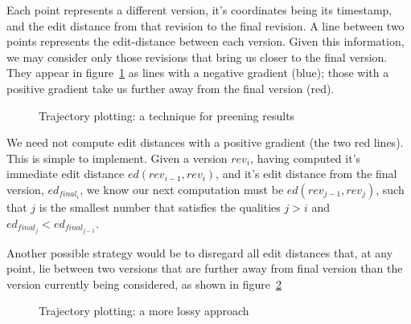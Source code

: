 Each point represents a different version, it's coordinates being its
timestamp, and the edit distance from that revision to the final
revision. A line between two points represents the edit-distance
between each version. Given this information, we may consider only
those revisions that bring us closer to the final version. They appear
in figure~\ref{fig:traj-preen-1} as lines with a negative gradient
(blue); those with a positive gradient take us further away from the
final version (red).

\begin{figure}
  \centering
  \pgfplotsset{width=0.4\textwidth}
  \caption{Trajectory plotting: a technique for preening results}
  \label{fig:traj-preen-1}
\end{figure}

We need not compute edit distances with a positive gradient (the two
red lines). This is simple to implement. Given a version $rev_i$, having
computed it's immediate edit distance $ed(rev_{i-1},rev_i)$, and it's edit
distance from the final version, $ed_{final_i}$, we know our next
computation must be $ed(rev_{j-1},rev_j)$, such that $j$ is the smallest
number that satisfies the qualities $j > i$ and $ed_{final_j} <
ed_{final_{j-1}}$.

Another possible strategy would be to disregard all edit distances
that, at any point, lie between two versions that are further away
from final version than the version currently being considered, as
shown in figure~\ref{fig:traj-preen-2}

\begin{figure}
  \centering
  \pgfplotsset{width=0.4\textwidth}
  \caption{Trajectory plotting: a more lossy approach}
  \label{fig:traj-preen-2}
\end{figure}

